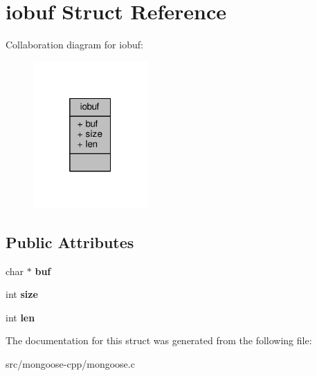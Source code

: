 \hypertarget{structiobuf}{}\section{iobuf Struct Reference}
\label{structiobuf}


Collaboration diagram for iobuf\+:
\nopagebreak
\begin{figure}[H]
\begin{center}
\leavevmode
\includegraphics[width=124pt]{da/d69/structiobuf__coll__graph}
\end{center}
\end{figure}
\subsection*{Public Attributes}
\begin{DoxyCompactItemize}
\item 
char $\ast$ {\bfseries buf}\hypertarget{structiobuf_a2ffa253d36125704954f291d3e76dfba}{}\label{structiobuf_a2ffa253d36125704954f291d3e76dfba}

\item 
int {\bfseries size}\hypertarget{structiobuf_a21956dbac907e950167154936d31f289}{}\label{structiobuf_a21956dbac907e950167154936d31f289}

\item 
int {\bfseries len}\hypertarget{structiobuf_a56fe8e95efb714a3c2cc715c13ee0a77}{}\label{structiobuf_a56fe8e95efb714a3c2cc715c13ee0a77}

\end{DoxyCompactItemize}


The documentation for this struct was generated from the following file\+:\begin{DoxyCompactItemize}
\item 
src/mongoose-\/cpp/mongoose.\+c\end{DoxyCompactItemize}
